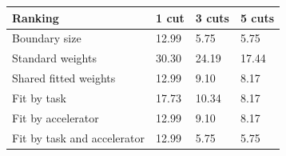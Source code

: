 \begin{tabular}{@{}llll@{}}
\toprule
Ranking & 1 cut & 3 cuts & 5 cuts \\
\midrule
Boundary size & 12.99 & 5.75 & 5.75 \\
Standard weights & 30.30 & 24.19 & 17.44 \\
Shared fitted weights & 12.99 & 9.10 & 8.17 \\
Fit by task & 17.73 & 10.34 & 8.17 \\
Fit by accelerator & 12.99 & 9.10 & 8.17 \\
Fit by task and accelerator & 12.99 & 5.75 & 5.75 \\
\bottomrule
\end{tabular}
